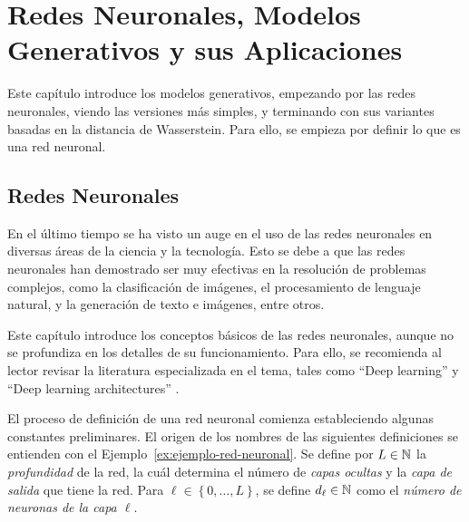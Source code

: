 \chapter{Redes Neuronales, Modelos Generativos y sus Aplicaciones}\label{chap:redes-neuronales-y-modelos-generativos}  %
Este capítulo introduce los modelos generativos, empezando por las redes neuronales, viendo las versiones más simples, y terminando con sus variantes basadas en la distancia de Wasserstein. Para ello, se empieza por definir lo que es una red neuronal.




\section{Redes Neuronales}\label{sec:redes-Neuronales}  %
En el último tiempo se ha visto un auge en el uso de las redes neuronales en diversas áreas de la ciencia y la tecnología. Esto se debe a que las redes neuronales han demostrado ser muy efectivas en la resolución de problemas complejos, como la clasificación de imágenes, el procesamiento de lenguaje natural, y la generación de texto e imágenes, entre otros.

Este capítulo introduce los conceptos básicos de las redes neuronales, aunque no se profundiza en los detalles de su funcionamiento. Para ello, se recomienda al lector revisar la literatura especializada en el tema, tales como ``Deep learning'' \cite{goodfellow2016deep} y ``Deep learning architectures'' \cite{calin2020deep}.

El proceso de definición de una red neuronal comienza estableciendo algunas constantes preliminares. El origen de los nombres de las siguientes definiciones se entienden con el Ejemplo~\ref{ex:ejemplo-red-neuronal}. Se define por $L\in\mathbb{N}$ la \emph{profundidad} de la red, la cuál determina el número de \textit{capas ocultas} y la \textit{capa de salida} que tiene la red. Para $\ell \in \left\{ 0,\ldots, L \right\}$, se define $d_\ell\in\mathbb{N}$ como el \emph{número de neuronas de la capa $\ell$}.

